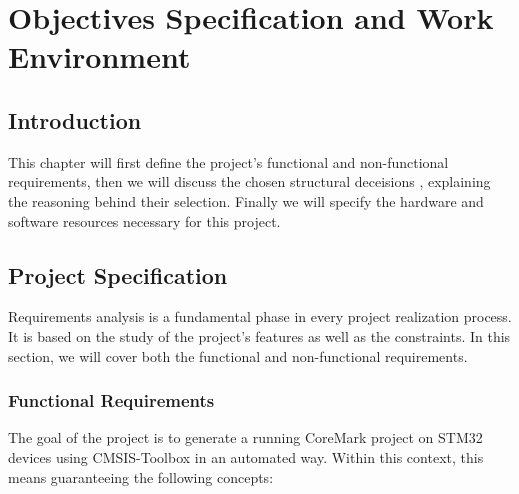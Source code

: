 \chapter{Objectives Specification and Work Environment}

\section*{Introduction}
This chapter will first define the project's functional and non-functional requirements, then we will discuss the chosen structural deceisions , explaining the reasoning behind their selection. Finally we will specify the hardware and software resources necessary for this project.

\section{Project Specification}
Requirements analysis is a fundamental phase in every project realization process. It is based on the study of the project's features as well as the constraints. In this section, we will cover both the functional and non-functional requirements.

\subsection{Functional Requirements}

The goal of the project is to generate a running CoreMark project on STM32 devices using CMSIS-Toolbox in an automated way. Within this context, this means guaranteeing the following concepts:

%

